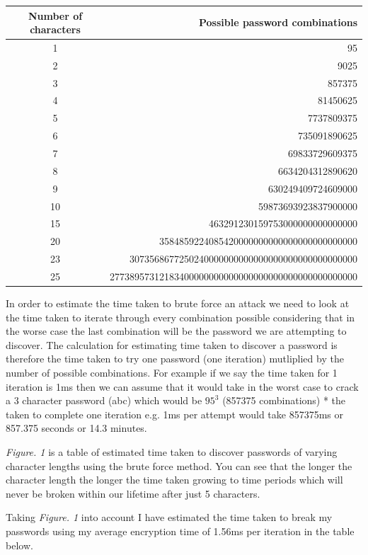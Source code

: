 \documentclass[a4paper, twoside, 11pt]{article}
\begin{document}
\begin{center}
	\begin{tabular}{ |c|r| } 
	 \hline
	 Number of characters & Possible password combinations \\
	 \hline
	 1 & 95 \\
	 2 & 9025 \\
	 3 & 857375 \\
	 4 & 81450625 \\
	 5 & 7737809375 \\
	 6 & 735091890625 \\
	 7 & 69833729609375 \\
	 8 & 6634204312890620 \\
	 9 & 630249409724609000 \\
	 10 & 59873693923837900000 \\
	 15 & 463291230159753000000000000000 \\
	 20 & 3584859224085420000000000000000000000000 \\
	 23 & 3073568677250240000000000000000000000000000000 \\
	 25 & 27738957312183400000000000000000000000000000000000  \\
	 \hline
	\end{tabular}
\end{center}

In order to estimate the time taken to brute force an attack we need to look at the time taken to iterate through every combination possible
 considering that in the worse case the last combination will be the password we are attempting to discover.
The calculation for estimating time taken to discover a password is therefore the time taken to try one password (one iteration)
 mutliplied by the number of possible combinations. For example if we say the time taken for 1 iteration is 1ms then we can assume that it
 would take in the worst case to crack a 3 character password (abc) which would be $95^3$ (857375 combinations) * the taken to complete one
 iteration e.g. 1ms per attempt would take 857375ms or 857.375 seconds or 14.3 minutes.

 \textit{Figure. 1} is a table of estimated time taken to discover passwords of varying character lengths using the brute force method. 
 You can see that the longer the character length the longer the time taken growing to time periods which will never be broken within
  our lifetime after just 5 characters. 

  Taking \textit{Figure. 1} into account I have estimated the time taken to break my passwords using my average encryption time of 1.56ms per iteration in the table below.
\end{document}
